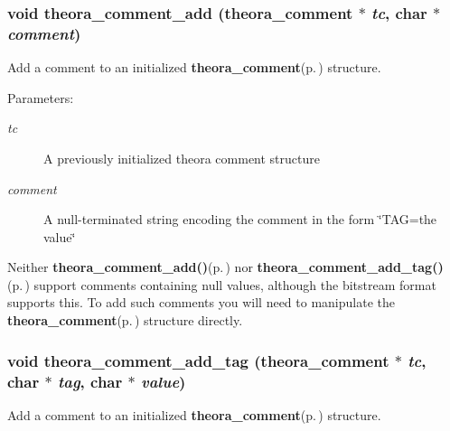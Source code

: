 \subsubsection{\setlength{\rightskip}{0pt plus 5cm}void theora\_\-comment\_\-add ({\bf theora\_\-comment} $\ast$ {\em tc}, char $\ast$ {\em comment})}\label{theora_8h_795da8fab8fe137dea276d6bf20bf5f2}


Add a comment to an initialized {\bf theora\_\-comment}{\rm (p.\,\pageref{structtheora__comment})} structure. 

\begin{Desc}
\item[Parameters:]
\begin{description}
\item[{\em tc}]A previously initialized theora comment structure \item[{\em comment}]A null-terminated string encoding the comment in the form \char`\"{}TAG=the value\char`\"{}\end{description}
\end{Desc}
Neither {\bf theora\_\-comment\_\-add()}{\rm (p.\,\pageref{theora_8h_795da8fab8fe137dea276d6bf20bf5f2})} nor {\bf theora\_\-comment\_\-add\_\-tag()}{\rm (p.\,\pageref{theora_8h_adc406fcdc1d2192ae2a9adfb3bd4e6f})} support comments containing null values, although the bitstream format supports this. To add such comments you will need to manipulate the {\bf theora\_\-comment}{\rm (p.\,\pageref{structtheora__comment})} structure directly. 
\subsubsection{\setlength{\rightskip}{0pt plus 5cm}void theora\_\-comment\_\-add\_\-tag ({\bf theora\_\-comment} $\ast$ {\em tc}, char $\ast$ {\em tag}, char $\ast$ {\em value})}\label{theora_8h_adc406fcdc1d2192ae2a9adfb3bd4e6f}


Add a comment to an initialized {\bf theora\_\-comment}{\rm (p.\,\pageref{structtheora__comment})} structure. 

